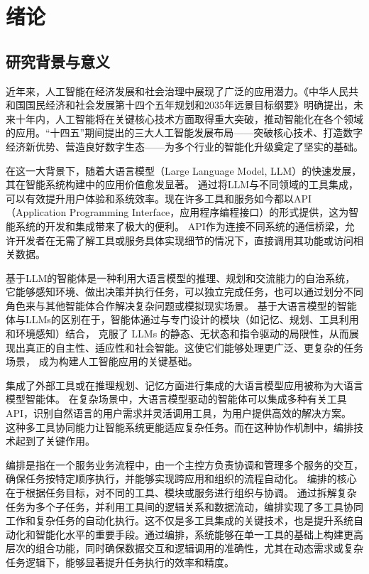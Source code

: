 
\chapter{绪论}

\section{研究背景与意义}


近年来，人工智能在经济发展和社会治理中展现了广泛的应用潜力。《中华人民共和国国民经济和社会发展第十四个五年规划和2035年远景目标纲要》明确提出，未来十年内，人工智能将在关键核心技术方面取得重大突破，推动智能化在各个领域的应用。“十四五”期间提出的三大人工智能发展布局——突破核心技术、打造数字经济新优势、营造良好数字生态——为多个行业的智能化升级奠定了坚实的基础。

在这一大背景下，随着大语言模型（Large Language Model, LLM）的快速发展，其在智能系统构建中的应用价值愈发显著。
通过将LLM与不同领域的工具集成，可以有效提升用户体验和系统效率。现在许多工具和服务如今都以API（Application Programming Interface，应用程序编程接口）的形式提供，这为智能系统的开发和集成带来了极大的便利。
API作为连接不同系统的通信桥梁，允许开发者在无需了解工具或服务具体实现细节的情况下，直接调用其功能或访问相关数据。

基于LLM的智能体是一种利用大语言模型的推理、规划和交流能力的自治系统，
它能够感知环境、做出决策并执行任务，可以独立完成任务，也可以通过划分不同角色来与其他智能体合作解决复杂问题或模拟现实场景。
基于大语言模型的智能体与LLMs的区别在于，智能体通过与专门设计的模块（如记忆、规划、工具利用和环境感知）结合，
克服了 LLMs 的静态、无状态和指令驱动的局限性，从而展现出真正的自主性、适应性和社会智能。这使它们能够处理更广泛、更复杂的任务场景，
成为构建人工智能应用的关键基础。\cite{Xi2023, Wang2023c}

集成了外部工具或在推理规划、记忆方面进行集成的大语言模型应用被称为大语言模型智能体。
在复杂场景中，大语言模型驱动的智能体可以集成多种有关工具API，识别自然语言的用户需求并灵活调用工具，为用户提供高效的解决方案。
这种多工具协同能力让智能系统更能适应复杂任务。而在这种协作机制中，编排技术起到了关键作用。

编排是指在一个服务业务流程中，由一个主控方负责协调和管理多个服务的交互，确保任务按特定顺序执行，并能够实现跨应用和组织的流程自动化。\cite{peltz2003web}
编排的核心在于根据任务目标，对不同的工具、模块或服务进行组织与协调。
通过拆解复杂任务为多个子任务，并利用工具间的逻辑关系和数据流动，编排实现了多工具协同工作和复杂任务的自动化执行。这不仅是多工具集成的关键技术，也是提升系统自动化和智能化水平的重要手段。通过编排，系统能够在单一工具的基础上构建更高层次的组合功能，同时确保数据交互和逻辑调用的准确性，尤其在动态需求或复杂任务逻辑下，能够显著提升任务执行的效率和精度。

